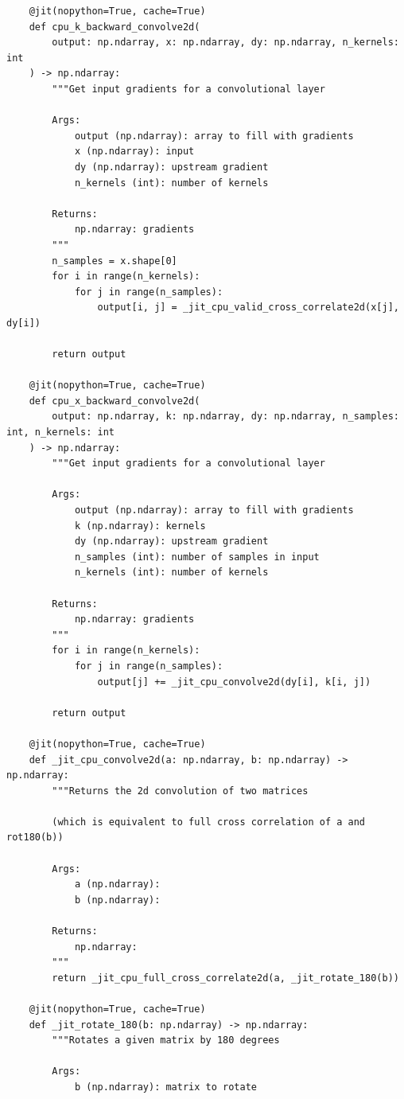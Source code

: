 \documentclass{article}
\begin{document}
\begin{verbatim}
    @jit(nopython=True, cache=True)
    def cpu_k_backward_convolve2d(
        output: np.ndarray, x: np.ndarray, dy: np.ndarray, n_kernels: int
    ) -> np.ndarray:
        """Get input gradients for a convolutional layer

        Args:
            output (np.ndarray): array to fill with gradients
            x (np.ndarray): input
            dy (np.ndarray): upstream gradient
            n_kernels (int): number of kernels

        Returns:
            np.ndarray: gradients
        """
        n_samples = x.shape[0]
        for i in range(n_kernels):
            for j in range(n_samples):
                output[i, j] = _jit_cpu_valid_cross_correlate2d(x[j], dy[i])

        return output

    @jit(nopython=True, cache=True)
    def cpu_x_backward_convolve2d(
        output: np.ndarray, k: np.ndarray, dy: np.ndarray, n_samples: int, n_kernels: int
    ) -> np.ndarray:
        """Get input gradients for a convolutional layer

        Args:
            output (np.ndarray): array to fill with gradients
            k (np.ndarray): kernels
            dy (np.ndarray): upstream gradient
            n_samples (int): number of samples in input
            n_kernels (int): number of kernels

        Returns:
            np.ndarray: gradients
        """
        for i in range(n_kernels):
            for j in range(n_samples):
                output[j] += _jit_cpu_convolve2d(dy[i], k[i, j])

        return output

    @jit(nopython=True, cache=True)
    def _jit_cpu_convolve2d(a: np.ndarray, b: np.ndarray) -> np.ndarray:
        """Returns the 2d convolution of two matrices

        (which is equivalent to full cross correlation of a and rot180(b))

        Args:
            a (np.ndarray):
            b (np.ndarray):

        Returns:
            np.ndarray:
        """
        return _jit_cpu_full_cross_correlate2d(a, _jit_rotate_180(b))

    @jit(nopython=True, cache=True)
    def _jit_rotate_180(b: np.ndarray) -> np.ndarray:
        """Rotates a given matrix by 180 degrees

        Args:
            b (np.ndarray): matrix to rotate


\end{verbatim}
\end{document}
